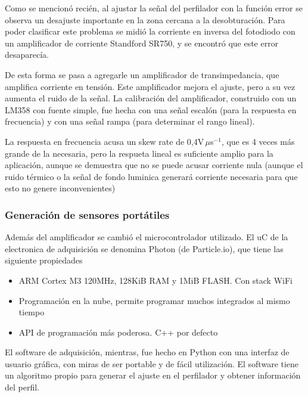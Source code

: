 
Como se mencionó recién, al ajustar la señal del perfilador con la función error se observa un desajuste importante en la zona cercana a la desobturación. Para poder clasificar este problema se midió la corriente en inversa del fotodiodo con un amplificador de corriente Standford SR750, y se encontró que este error desaparecía. 

De esta forma se pasa a agregarle un amplificador de transimpedancia, que amplifica corriente en tensión. Este amplificador mejora el ajuste, pero a su vez aumenta el ruido de la señal. La calibración del amplificador, construido con un LM358 con fuente simple, fue hecha con una señal escalón (para la respuesta en frecuencia) y con una señal rampa (para determinar el rango lineal). 

La respuesta en frecuencia acusa un skew rate de 0,4V$\,\mu$s$^{-1}$, que es 4 veces más grande de la necesaria, pero la respueta lineal es suficiente amplio para la aplicación, aunque se demuestra que no se puede acusar corriente nula (aunque el ruido térmico o la señal de fondo luminica generará corriente necesaria para que esto no genere inconvenientes)
   
  
\subsubsection{Generación de sensores portátiles}
    Además del amplificador se cambió el microcontrolador utilizado. El uC de la electronica de adquisición se denomina Photon (de Particle.io), que tiene las siguiente propiedades
    \begin{itemize}
        \item ARM Cortex M3 120MHz, 128KiB RAM y 1MiB FLASH. Con stack WiFi
        \item Programación en la nube, permite programar muchos integrados al mismo tiempo
        \item API de programación más poderosa. C++ por defecto
    \end{itemize}
    
    El software de adquisición, mientras, fue hecho en Python con una interfaz de usuario gráfica, con miras de ser portable y de fácil utilización. El software tiene un algoritmo propio para generar el ajuste en el perfilador y obtener información del perfil.
    
